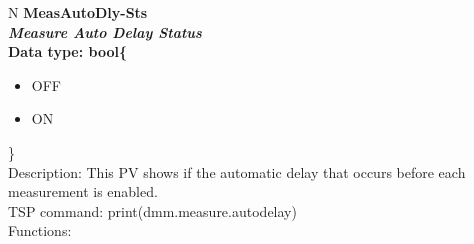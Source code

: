 \documentclass[openany]{article}
\begin{document}
		\begin{tabular}{N}
			\hline
			\bfseries MeasAutoDly-Sts\label{pv:measautodly-sts} \\ \hline
			\emph{Measure Auto Delay Status} \\
			Data type: bool\{\begin{itemize}[noitemsep]
				\small
				\item[] OFF
				\item[] ON
			\end{itemize}\} \\
			Description: This PV shows if the automatic delay that occurs before each measurement is enabled. \\
			TSP command: print(dmm.measure.autodelay) \\
			Functions: \\
			\arrayrulecolor{\FuncTableBorderColor}

		\end{tabular}
\end{document}
